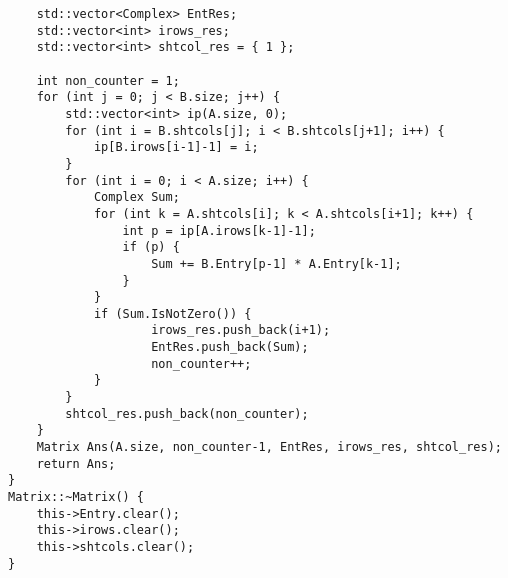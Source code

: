 \documentclass[12pt]{report}
\begin{document}
\begin{lstlisting}
    std::vector<Complex> EntRes;
    std::vector<int> irows_res;
    std::vector<int> shtcol_res = { 1 };

    int non_counter = 1;
    for (int j = 0; j < B.size; j++) {
        std::vector<int> ip(A.size, 0);
        for (int i = B.shtcols[j]; i < B.shtcols[j+1]; i++) {
            ip[B.irows[i-1]-1] = i;
        }
        for (int i = 0; i < A.size; i++) {
            Complex Sum;
            for (int k = A.shtcols[i]; k < A.shtcols[i+1]; k++) {
                int p = ip[A.irows[k-1]-1];
                if (p) {
                    Sum += B.Entry[p-1] * A.Entry[k-1];
                }
            }
            if (Sum.IsNotZero()) {
                    irows_res.push_back(i+1);
                    EntRes.push_back(Sum);
                    non_counter++;
            }
        }
        shtcol_res.push_back(non_counter);
    }
    Matrix Ans(A.size, non_counter-1, EntRes, irows_res, shtcol_res);
    return Ans;
}
Matrix::~Matrix() {
    this->Entry.clear();
    this->irows.clear();
    this->shtcols.clear();
}

\end{lstlisting}
\end{document}
